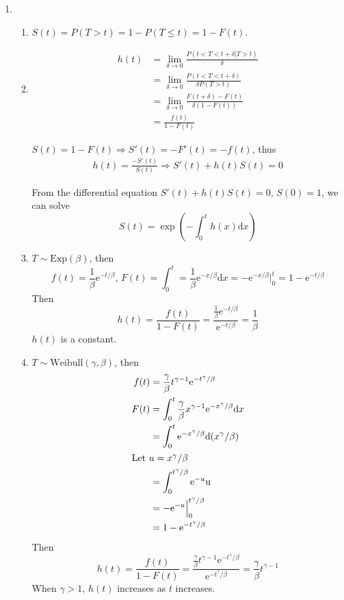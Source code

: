 \documentclass{article}
\begin{document}
\begin{enumerate}[leftmargin = 0 em, label = \arabic*., font = \bfseries]
	\item 
	\begin{enumerate}
		\item $S(t) = P(T > t) = 1 - P(T \leq t) = 1 - F(t)$.

		\item 
		\begin{align*}
		h(t) &= \lim_{\delta \to 0} \frac{P(t< T < t + \delta | T > t)}{\delta}\\
		& = \lim_{\delta \to 0} \frac{P(t < T < t + \delta)}{\delta P(T > t)}\\
		& = \lim_{\delta \to 0} \frac{F(t + \delta) - F(t)}{\delta (1 - F(t))}\\
		& =  \frac{f(t)}{1 - F(t)}
		\end{align*}
		
$S(t) = 1 - F(t) \Rightarrow S'(t) = - F'(t) = -f(t)$, thus
\begin{align*}
h(t) = \frac{-S'(t)}{S(t)} \Rightarrow S'(t) + h(t) S(t) = 0
\end{align*}

From the differential equation $S'(t) + h(t) S(t) = 0,\, S(0) = 1$, we can solve 
\[S(t) = \exp \left(- \int_{0}^t h(x) \mathrm{d}x\right)\]

\item 
$T \sim \mathrm{Exp}(\beta)$, then
\[f(t) = \frac{1}{\beta} \mathrm{e}^{-t / \beta},\, F(t) = \int_{0}^t = \frac{1}{\beta} \mathrm{e}^{-x/\beta}\mathrm{d}x = - \mathrm{e}^{- x / \beta}|_0^t = 1 - \mathrm{e}^{- t / \beta}\]
Then
\[h(t) = \frac{f(t)}{1 - F(t)} = \frac{\frac{1}{\beta}\mathrm{e}^{- t / \beta}}{\mathrm{e}^{-t / \beta}} = \frac{1}{\beta}\]
$h(t)$ is a constant.


\item 
$T \sim \mathrm{Weibull}(\gamma , \beta)$, then
\begin{align*}
f(t) & = \frac{\gamma}{\beta} t^{\gamma - 1} \mathrm{e}^{-t^\gamma / \beta}\\
F(t) & = \int_{0}^t \frac{\gamma}{\beta} x^{\gamma - 1} \mathrm{e}^{-x^\gamma / \beta} \mathrm{d}x\\
& = \int_{0}^t \mathrm{e}^{- x^\gamma / \beta} \mathrm{d}(x^\gamma / \beta)\\
\intertext{Let $u = x^\gamma / \beta$}
& = \int_0^{t^\gamma / \beta} \mathrm{e}^{-u} \mathrm{u}\\
& = -\mathrm{e}^{-u}\Big|_{0}^{t^\gamma / \beta}\\
& = 1 - \mathrm{e}^{- t^\gamma/\beta}
\end{align*}
Then
\[h(t) = \frac{f(t)}{1 - F(t)} = \frac{\frac{\gamma}{\beta} t^{\gamma - 1} \mathrm{e}^{-t^\gamma / \beta}}{\mathrm{e}^{- t^\gamma/\beta}} = \frac{\gamma}{\beta} t^{\gamma - 1}\]
When $\gamma > 1$, $h(t)$ increases as $t$ increases.

	\end{enumerate}
	

	
	
 	\end{enumerate}


	
	
	
	
\end{document}

